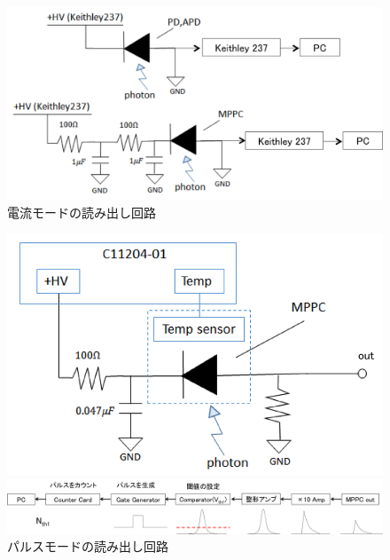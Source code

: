 \begin{figure}[H]
 \begin{center}
 \includegraphics[bb=0.000000 0.000000 515.957348 264.458138,width=1\hsize]{image2/chapter5/read_circuit_current.png} 
 \end{center}
 \caption{電流モードの読み出し回路}
 \label{fig:read_circuit_current}
\end{figure}


\begin{figure}[H]
 \begin{minipage}{0.5\vsize}
 \hspace{3 cm}
   \includegraphics[bb=0.000000 0.000000 377.728774 242.859924,width=0.8\hsize]{image2/chapter5/read_circuit_pulse.png} 
  \vspace{0 cm}
   \end{minipage}
 \begin{minipage}{0.5\vsize}  
  \hspace{-1 cm}
 \includegraphics[bb=0.000000 0.000000 1008.876600 145.907938,width=1.5\hsize]{image2/chapter5/read_circuit_pulse2.png} 
 \end{minipage}
 \begin{center}
  \caption{パルスモードの読み出し回路}
  \label{fig:read_circuit_pulse}
  \end{center}
\end{figure}





